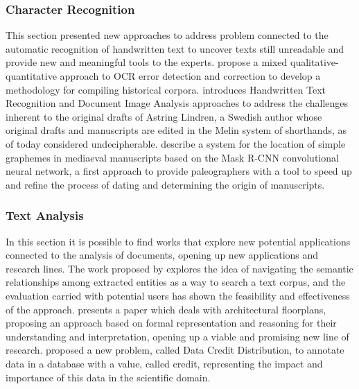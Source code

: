 \documentclass[sigconf, nonacm]{acmart}
\begin{document}
\subsubsection*{Character Recognition}
This section presented new approaches to address problem connected to the automatic recognition of handwritten text to uncover texts still unreadable and provide new and meaningful tools to the experts.
\citet{FanteN21} propose a mixed qualitative-quantitative approach to OCR error detection and correction to develop a methodology for compiling historical corpora. 
\citet{HeilNH21} introduces Handwritten Text Recognition and Document Image Analysis approaches to address the challenges inherent to the original drafts of Astring Lindren, a Swedish author whose original drafts and manuscripts are edited in the Melin system of shorthands, as of today considered undecipherable. 
\citet{MarinaiPRS21} describe a system for the location of simple graphemes in mediaeval manuscripts based on the Mask R-CNN convolutional neural network, a first approach to provide paleographers with a tool to speed up and refine the process of dating and determining the origin of manuscripts.

\subsubsection*{Text Analysis}
In this section it is possible to find works that explore new potential applications connected to the analysis of documents, opening up new applications and research lines. 
The work proposed by \citet{BernasconiCM21} explores the idea of navigating the semantic relationships among extracted entities as a way to search a text corpus, and the evaluation carried with potential users has shown the feasibility and effectiveness of the approach.
\citet{Ferilli21} presents a paper which deals with architectural floorplans, proposing an approach based on formal representation and reasoning for their understanding and interpretation, opening up a viable and promising new line of research.  
\citet{DossoS21} proposed a new problem, called Data Credit Distribution, to annotate data in a database with a value, called credit, representing the impact and importance of this data in the scientific domain. 
\end{document}
